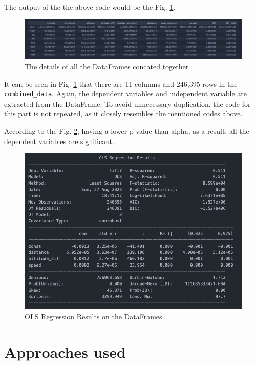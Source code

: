 The output of the the above code would be the Fig. \ref{fig:df_describe}.

\begin{figure}[htb]
	\includegraphics[width=\textwidth]{resources/df_describe.png}
	\caption{The details of all the DataFrames concated together}
	\label{fig:df_describe}
\end{figure}

It can be seen in Fig. \ref{fig:df_describe} that there are 11 columns 
and 246,395 rows in the \texttt{combined\_data}.
Again, the dependent variables and independent variable are extracted from the DataFrame.
To avoid unnecessary duplication, the code for this part is not repeated, as it closely resembles the mentioned codes above.

According to the Fig. \ref{fig:ols}, 
having a lower p-value than alpha, as a result,
all the dependent variables are significant.
\begin{figure}[htb]
	\includegraphics[width=\textwidth]{resources/ols.png}
	\caption{OLS Regression Results on the DataFrames}
	\label{fig:ols}
\end{figure}

\section{Approaches used}

